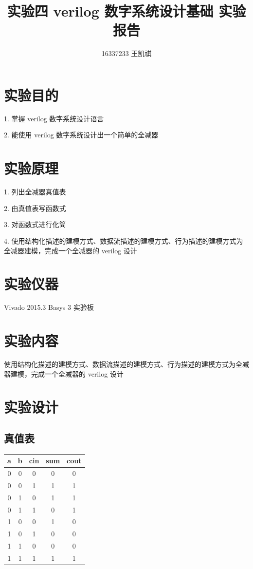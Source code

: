 \documentclass{article}
\begin{document}
\title{实验四 \text{ } verilog 数字系统设计基础 \text{ } 实验报告}
\author {16337233 王凯祺}
\maketitle

\section{实验目的}

1. 掌握 verilog 数字系统设计语言

2. 能使用 verilog 数字系统设计出一个简单的全减器

\section{实验原理}

1. 列出全减器真值表

2. 由真值表写函数式

3. 对函数式进行化简

4. 使用结构化描述的建模方式、数据流描述的建模方式、行为描述的建模方式为全减器建模，完成一个全减器的 verilog 设计

\section{实验仪器}

Vivado 2015.3
Basys 3 实验板

\section{实验内容}

使用结构化描述的建模方式、数据流描述的建模方式、行为描述的建模方式为全减器建模，完成一个全减器的 verilog 设计

\newpage

\section{实验设计}

\subsection{真值表}

\begin{table}[!hbp]
\centering
\begin{tabular}{|c|c|c||c|c|}
\hline
a & b & cin & sum & cout \\
\hline
\hline
0 & 0 & 0 & 0 & 0 \\
\hline
0 & 0 & 1 & 1 & 1 \\
\hline
0 & 1 & 0 & 1 & 1 \\
\hline
0 & 1 & 1 & 0 & 1 \\
\hline
1 & 0 & 0 & 1 & 0 \\
\hline
1 & 0 & 1 & 0 & 0 \\
\hline
1 & 1 & 0 & 0 & 0 \\
\hline
1 & 1 & 1 & 1 & 1 \\
\hline

\end{tabular}
\end{table}
\end{document}
